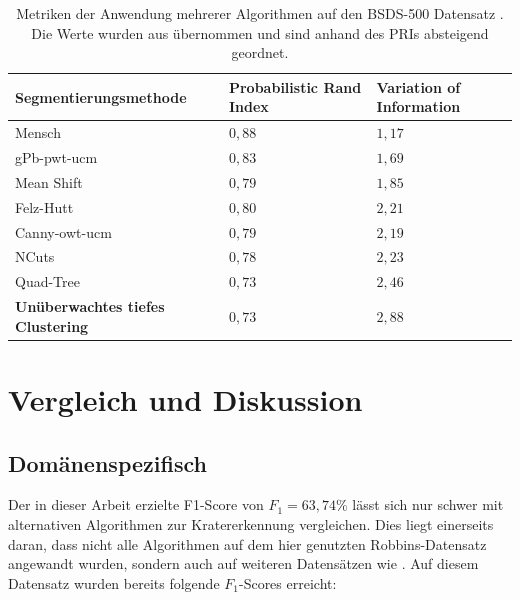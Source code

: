 \begin{table}
	\begin{tabularx}{\textwidth}{p{} >{\centering} p{} >{\centering\arraybackslash} p{}}
		\toprule
		\textbf{Segmentierungsmethode} & \textbf{Probabilistic Rand Index} & \textbf{Variation of Information} \\
		\midrule
		Mensch \cite{bsd500} & $0,88$ & $1,17$ \\
		\midrule
		gPb-pwt-ucm \cite{arbelaez_10} & $0,83$ & $1,69$ \\
		Mean Shift \cite{comaniciu_02} & $0,79$ & $1,85$ \\
		Felz-Hutt \cite{felzenszwalb_04} & $0,80$ & $2,21$ \\
		Canny-owt-ucm \cite{arbelaez_10} & $0,79$ & $2,19$ \\
		NCuts \cite{cour_05} & $0,78$ & $2,23$ \\
		Quad-Tree & $0,73$ & $2,46$ \\
		\textbf{Unüberwachtes tiefes Clustering} & $0,73$ & $2,88$ \\
		\bottomrule
	\end{tabularx}
	\caption{Metriken der Anwendung mehrerer Algorithmen auf den BSDS-500 Datensatz \cite{bsd500}. Die Werte wurden aus \cite{arbelaez_10} übernommen und sind anhand des PRIs absteigend geordnet.}
	\label{tab:res_bsds500}
\end{table}


\section{Vergleich und Diskussion}
\label{sec:discussion}

\subsection{Domänenspezifisch}

Der in dieser Arbeit erzielte F1-Score von $F_1=63,74\%$ lässt sich nur schwer mit alternativen Algorithmen zur Kratererkennung vergleichen. Dies liegt einerseits daran, dass nicht alle Algorithmen auf dem hier genutzten Robbins-Datensatz \cite{robbins_12} angewandt wurden, sondern auch auf weiteren Datensätzen wie \cite{bandeira_10}. Auf diesem Datensatz wurden bereits folgende $F_1$-Scores erreicht:

